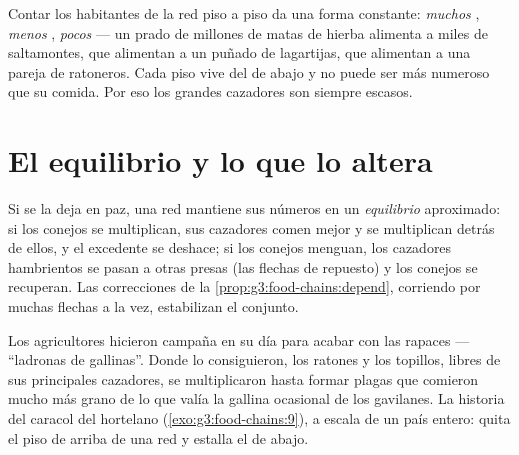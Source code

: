 \begin{proposition}\label{prop:g5:food-webs:pyramid}
Contar los habitantes de la red piso a piso da una forma constante:
\emph{muchos} , \emph{menos} , \emph{pocos}
 --- un prado de millones de matas de hierba alimenta a
miles de saltamontes, que alimentan a un puñado de lagartijas, que
alimentan a una pareja de ratoneros. Cada piso vive del de abajo y no
puede ser más numeroso que su comida. Por eso los grandes cazadores
son siempre escasos.
\end{proposition}
\admitted

\section{El equilibrio y lo que lo altera}

\begin{proposition}\label{prop:g5:food-webs:balance}
Si se la deja en paz, una red mantiene sus números en un
\emph{equilibrio}
aproximado: si los conejos se multiplican, sus cazadores comen mejor y
se multiplican detrás de ellos, y el excedente se deshace; si los
conejos menguan, los cazadores hambrientos se pasan a otras presas
(las flechas de repuesto) y los conejos se recuperan. Las correcciones
de la \cref{prop:g3:food-chains:depend}, corriendo por muchas flechas
a la vez, estabilizan el conjunto.
\end{proposition}
\admitted

\begin{example}\label{ex:g5:food-webs:mistake}
Los agricultores hicieron campaña en su día para acabar con las 
rapaces --- ``ladronas de gallinas''. Donde lo consiguieron, los
ratones y los topillos, libres de sus principales cazadores, se
multiplicaron hasta formar plagas que comieron mucho más grano de lo
que valía la gallina ocasional de los gavilanes. La historia del
caracol del hortelano (\cref{exo:g3:food-chains:9}), a escala de un
país entero: quita el piso de arriba de una red y estalla el de abajo.
\end{example}


